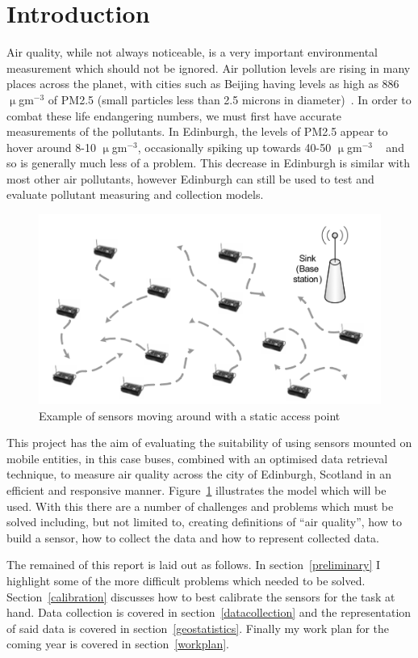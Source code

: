\section{Introduction}\label{intro}


Air quality, while not always noticeable, is a very important environmental measurement which should not be ignored. Air pollution levels are rising in many places across the planet, with cities such as Beijing having levels as high as 886 $\upmu$gm$^{-3}$ of PM2.5 (small particles less than 2.5 microns in diameter)~\cite{beijinghightwitter}. In order to combat these life endangering numbers, we must first have accurate measurements of the pollutants. In Edinburgh, the levels of PM2.5 appear to hover around 8-10 $\upmu$gm$^{-3}$, occasionally spiking up towards 40-50 $\upmu$gm$^{-3}$ ~\cite{pm2point5inscotland} and so is generally much less of a problem. This decrease in Edinburgh is similar with most other air pollutants, however Edinburgh can still be used to test and evaluate pollutant measuring and collection models. 

\begin{figure}[H]
    \begin{center}
        \includegraphics[scale=0.5]{./images/mpp1/BusModel.png}
        \caption{Example of sensors moving around with a static access point}
        \label{fig:busmodel}
    \end{center}
\end{figure}

This project has the aim of evaluating the suitability of using sensors mounted on mobile entities, in this case buses, combined with an optimised data retrieval technique, to measure air quality across the city of Edinburgh, Scotland in an efficient and responsive manner. Figure~\ref{fig:busmodel} illustrates the model which will be used. With this there are a number of challenges and problems which must be solved including, but not limited to, creating definitions of ``air quality'', how to build a sensor, how to collect the data and how to represent collected data. 

The remained of this report is laid out as follows. In section~\ref{preliminary} I highlight some of the more difficult problems which needed to be solved. Section~\ref{calibration} discusses how to best calibrate the sensors for the task at hand. Data collection is covered in section~\ref{datacollection} and the representation of said data is covered in section~\ref{geostatistics}. Finally my work plan for the coming year is covered in section~\ref{workplan}.

